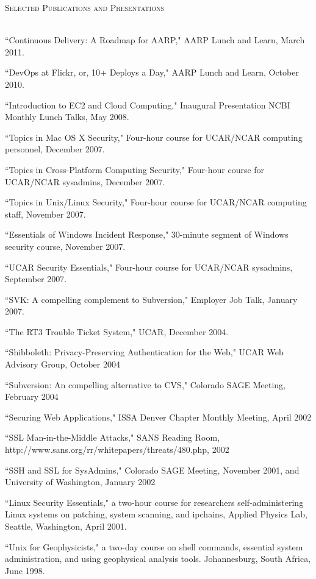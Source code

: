 \documentclass{article}
\newcommand{\lineunder}{\vspace*{-8pt} \\ \hspace*{-18pt} \hrulefill \\}
\newcommand{\header}[1]{{\hspace*{-15pt}\vspace*{6pt} \textsc{#1}} \vspace*{-6pt} \lineunder}
\newenvironment{achievements}{\begin{list}{\topsep 0pt \itemsep -2pt}} {\vspace*{4pt}\end{list}}
\begin{document}
\header{Selected Publications and Presentations}
\begin{achievements}
\item ``Continuous Delivery: A Roadmap for AARP," AARP Lunch and Learn, March 2011.
\item ``DevOps at Flickr, or, 10+ Deploys a Day," AARP Lunch and Learn, October 2010.
\item ``Introduction to EC2 and Cloud Computing," Inaugural Presentation NCBI Monthly Lunch Talks, May 2008.
\item ``Topics in Mac OS X Security," Four-hour course for UCAR/NCAR computing personnel, December 2007.
\item ``Topics in Cross-Platform Computing Security," Four-hour course for UCAR/NCAR sysadmins, December 2007.  
\item ``Topics in Unix/Linux Security," Four-hour course for UCAR/NCAR computing staff, November 2007.
\item ``Essentials of Windows Incident Response," 30-minute segment of Windows security course, November 2007.
\item ``UCAR Security Essentials,"  Four-hour course for UCAR/NCAR sysadmins, September 2007.
\item ``SVK: A compelling complement to Subversion," Employer Job Talk, January 2007.
\item ``The RT3 Trouble Ticket System," UCAR, December 2004.  
\item ``Shibboleth: Privacy-Preserving Authentication for the Web," UCAR Web Advisory Group, October 2004
\item ``Subversion: An compelling alternative to CVS," Colorado SAGE Meeting, February 2004
\item ``Securing Web Applications," ISSA Denver Chapter Monthly Meeting, April 2002
\item ``SSL Man-in-the-Middle Attacks," SANS Reading Room, http://www.sans.org/rr/whitepapers/threats/480.php, 2002
\item ``SSH and SSL for SysAdmins," Colorado SAGE Meeting, November 2001, and University of Washington, January 2002
\item ``Linux Security Essentials," a two-hour course for researchers self-administering Linux systems on patching, system scanning, and ipchains,  Applied Physics Lab, Seattle, Washington, April 2001.
\item ``Unix for Geophysicists," a two-day course on shell commands, essential system administration, and using geophysical analysis tools.  Johannesburg, South Africa, June 1998.
\end{achievements}
\end{document}
